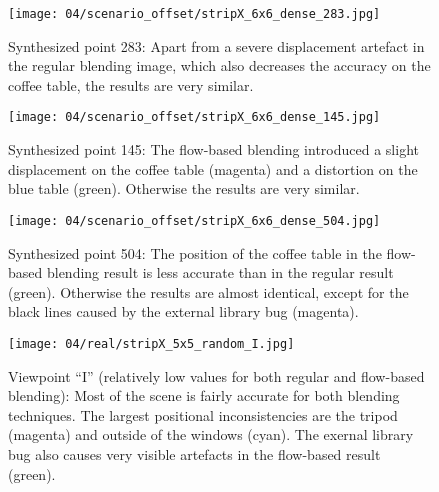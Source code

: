 
\begin{figure}
  \centering
  \texttt{[image: 04/scenario\_offset/stripX\_6x6\_dense\_283.jpg]}
  \caption[Viewpoint 283 of 625 in the square room]{Synthesized point 283: Apart from a severe displacement artefact in the regular blending image, which also decreases the accuracy on the coffee table, the results are very similar.}
  \label{fig:offset_283}
\end{figure}

\begin{figure}
  \centering
  \texttt{[image: 04/scenario\_offset/stripX\_6x6\_dense\_145.jpg]}
  \caption[Viewpoint 145 of 625 in the square room]{Synthesized point 145: The flow-based blending introduced a slight displacement on the coffee table (magenta) and a distortion on the blue table (green). Otherwise the results are very similar.}
  \label{fig:offset_145}
\end{figure}

\begin{figure}
  \centering
  \texttt{[image: 04/scenario\_offset/stripX\_6x6\_dense\_504.jpg]}
  \caption[Viewpoint 504 of 625 in the square room]{Synthesized point 504: The position of the coffee table in the flow-based blending result is less accurate than in the regular result (green). Otherwise the results are almost identical, except for the black lines caused by the external library bug (magenta).}
  \label{fig:offset_504}
\end{figure}

\begin{figure}
  \centering
  \texttt{[image: 04/real/stripX\_5x5\_random\_I.jpg]}
  \caption[Viewpoint ``I'' in the real scene]{Viewpoint ``I'' (relatively low values for both regular and flow-based blending): Most of the scene is fairly accurate for both blending techniques. The largest positional inconsistencies are the tripod (magenta) and outside of the windows (cyan). The exernal library bug also causes very visible artefacts in the flow-based result (green).}
  \label{fig:real_I}
\end{figure}


